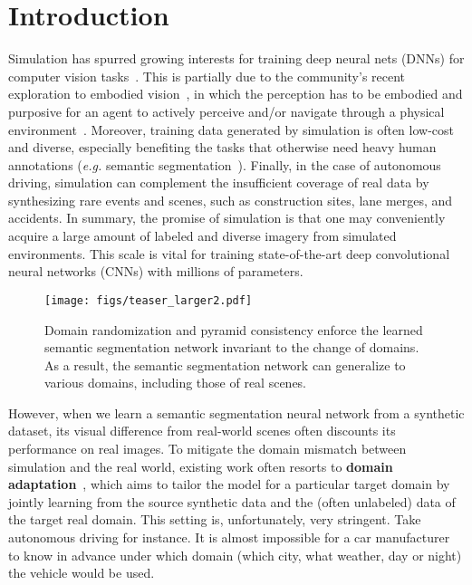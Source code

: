 \documentclass[10pt,twocolumn,letterpaper]{article}
\begin{document}
\section{Introduction}
Simulation has spurred growing interests for  training deep neural nets (DNNs) for computer vision tasks~\cite{xiazamirhe2018gibsonenv, carla,kolve2017ai2,yue2018lidar}. This is partially due to the community's recent exploration to embodied  vision~\cite{tobin2017domain,zhu2017target,bousmalis2018using}, in which the perception has to be embodied and purposive for an agent to actively perceive and/or navigate through a physical environment~\cite{das2018embodied, carla}. Moreover, training data generated by simulation is often low-cost and diverse, especially benefiting the tasks that otherwise need heavy human annotations (\textit{e.g.} semantic segmentation~\cite{fcn_in_the_wild, zhang2017curriculum, Hoffman_cycada2017}). Finally, in the case of autonomous driving, simulation can complement the insufficient coverage of real data by synthesizing rare events and scenes, such as construction sites, lane merges, and accidents. In summary, the promise of simulation is that one may conveniently acquire a large amount of labeled and diverse imagery from simulated environments. This scale is vital for training state-of-the-art deep convolutional neural networks (CNNs) with millions of parameters.

\begin{figure}[t]
  \centering
  \texttt{[image: figs/teaser\_larger2.pdf]}
\caption{Domain randomization and pyramid consistency enforce the learned semantic segmentation network invariant to the change of domains. As a result, the semantic segmentation network can generalize to various domains, including those of real scenes.}
  \label{fig:teaser}
  \vspace{-10pt}
\end{figure}

However, when we learn a semantic segmentation neural network from a synthetic dataset, its visual difference from real-world scenes often discounts its performance on real images.  To mitigate the domain mismatch between simulation and the real world, existing work often resorts to \textbf{domain adaptation}~\cite{fcn_in_the_wild,Hoffman_cycada2017,zhang2017curriculum}, which aims to tailor the model for a particular target domain by jointly learning from the source synthetic data and the (often unlabeled) data of the target real domain. This setting is, unfortunately, very stringent. Take autonomous driving for instance. It is almost impossible for a car manufacturer to know in advance under which domain (which city, what weather, day or night) the vehicle would be used.
\end{document}
